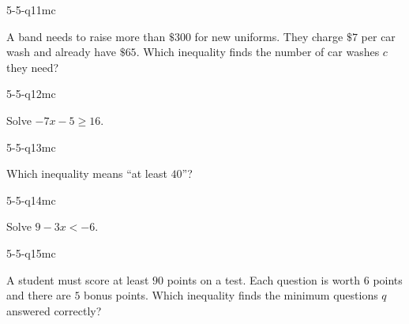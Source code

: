 \begin{practiceQuestion}{5-5-q11}{mc}
\begin{questionText}
A band needs to raise more than $\$300$ for new uniforms. They charge $\$7$ per car wash and already have $\$65$. Which inequality finds the number of car washes $c$ they need?
\end{questionText}
\end{practiceQuestion}

\begin{practiceQuestion}{5-5-q12}{mc}
\begin{questionText}
Solve $-7x - 5 \geq 16$.
\end{questionText}
\end{practiceQuestion}

\begin{practiceQuestion}{5-5-q13}{mc}
\begin{questionText}
Which inequality means ``at least $40$''?
\end{questionText}
\end{practiceQuestion}

\begin{practiceQuestion}{5-5-q14}{mc}
\begin{questionText}
Solve $9 - 3x < -6$.
\end{questionText}
\end{practiceQuestion}

\begin{practiceQuestion}{5-5-q15}{mc}
\begin{questionText}
A student must score at least $90$ points on a test. Each question is worth $6$ points and there are $5$ bonus points. Which inequality finds the minimum questions $q$ answered correctly?
\end{questionText}
\end{practiceQuestion}

